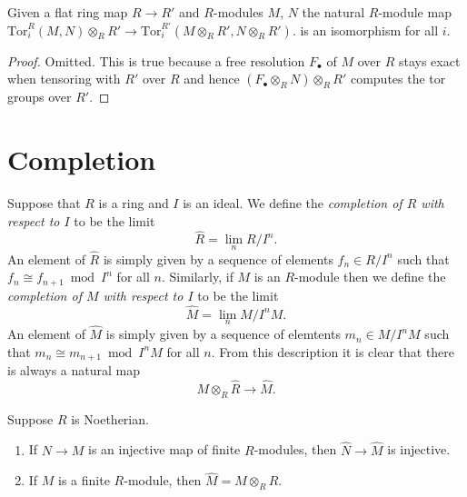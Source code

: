 \begin{lemma}
\label{lemma-flat-base-change-tor}
Given a flat ring map $R \to R'$ and $R$-modules
$M$, $N$ the natural $R$-module map
$\text{Tor}_i^R(M, N)\otimes_R R'
\to \text{Tor}_i^{R'}(M \otimes_R R', N\otimes_R R')$.
is an isomorphism for all $i$.
\end{lemma}

\begin{proof}
Omitted. This is true because a free resolution $F_\bullet$ of $M$ over
$R$ stays exact when tensoring with $R'$ over $R$ and hence
$(F_\bullet \otimes_R N)\otimes_R R'$ computes the tor groups
over $R'$.
\end{proof}


















\section{Completion}
\label{section-completion}

\noindent
Suppose that $R$ is a ring and $I$ is an ideal.
We define the {\it completion of $R$ with respect to $I$}
to be the limit
$$
\hat R = \lim_{n} R/I^n.
$$
An element of $\hat R$ is simply given by a sequence
of elements $f_n \in R/I^n$ such that $f_n \cong f_{n+1} \bmod I^n$
for all $n$. Similarly, if $M$ is an $R$-module then we define the
{\it completion of $M$ with respect to $I$}
to be the limit
$$
\hat M = \lim_{n} M/I^nM.
$$
An element of $\hat M$ is simply given by a sequence of
elemtents $m_n \in M/I^nM$ such that $m_n \cong m_{n+1} \bmod I^nM$
for all $n$. From this description it is clear that there 
is always a natural map
$$
M \otimes_R \hat R
\longrightarrow
\hat M.
$$

\begin{lemma}
\label{lemma-completion-tensor}
Suppose $R$ is Noetherian.
\begin{enumerate}
\item If $N \to M$ is an injective map of finite $R$-modules,
then $\hat N \to \hat M$ is injective.
\item If $M$ is a finite $R$-module, then $\hat M = M \otimes_R \hat R$.
\end{enumerate}
\end{lemma}

